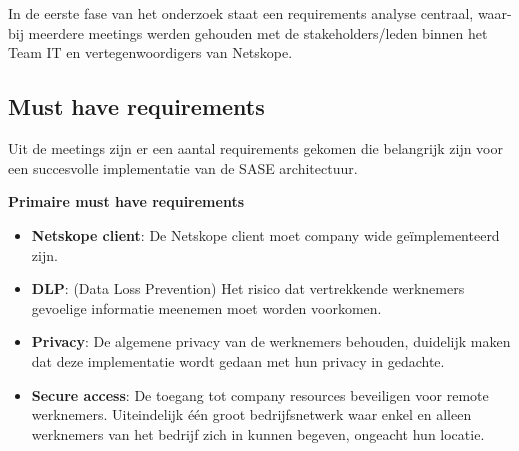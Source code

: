 
\chapter{}%
\label{ch:requirements analyse}

In de eerste fase van het onderzoek staat een requirements analyse centraal, waar-
bij meerdere meetings werden gehouden met de stakeholders/leden
binnen het Team IT en vertegenwoordigers van Netskope.

\section{Must have requirements}
Uit de meetings zijn er een aantal requirements gekomen die belangrijk zijn voor een succesvolle implementatie van de SASE architectuur.

\vspace{2ex}

\textbf{Primaire must have requirements}
\begin{itemize}
  \item \textbf{Netskope client}: De Netskope client moet company wide geïmplementeerd zijn. 
  \item \textbf{DLP}: (Data Loss Prevention) Het risico dat vertrekkende werknemers gevoelige informatie meenemen moet worden voorkomen.
  \item \textbf{Privacy}: De algemene privacy van de werknemers behouden, duidelijk maken dat deze implementatie wordt gedaan met hun privacy in gedachte.
  \item \textbf{Secure access}: De toegang tot company resources beveiligen voor remote werknemers. Uiteindelijk één groot bedrijfsnetwerk waar enkel en alleen werknemers van het bedrijf zich in kunnen begeven, ongeacht hun locatie.
\end{itemize}

\vspace{2ex}

